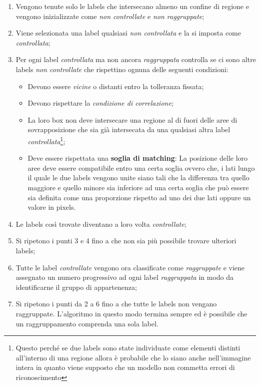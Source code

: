 \begin{enumerate}
\item Vengono tenute solo le labels che intersecano almeno un confine di regione e vengono inizializzate come \textit{non controllate} e \textit{non raggruppate};
\item Viene selezionata una label qualsiasi \textit{non controllata} e la si imposta come \textit{controllata};
\item Per ogni label \textit{controllata} ma non ancora \textit{raggruppata} controlla se ci sono altre labels \textit{non controllate} che rispettino ognuna delle seguenti condizioni:
  \begin{itemize}
  \item Devono essere \textit{vicine} o distanti entro la tolleranza fissata;
  \item Devono rispettare la \textit{condizione di correlazione};
  \item La loro box non deve intersecare una regione al di fuori delle aree di sovrapposizione che sia già intersecata da una qualsiasi altra label \textit{controllata}\footnote{Questo perché se due labels sono state individuate come elementi distinti all'interno di una regione allora è probabile che lo siano anche nell'immagine intera in quanto viene supposto che un modello non commetta errori di riconoscimento};
  \item Deve essere rispettata una \textbf{soglia di matching}: La posizione delle loro aree deve essere compatibile entro una certa soglia ovvero che, i lati lungo il quale le due labels vengono unite siano tali che la differenza tra quello maggiore e quello minore sia inferiore ad una certa soglia che può essere sia definita come una proporzione rispetto ad uno dei due lati oppure un valore in pixels.
  \end{itemize}  
\item Le labels così trovate diventano a loro volta \textit{controllate};
\item Si ripetono i punti 3 e 4 fino a che non sia più possibile trovare ulteriori labels;
\item Tutte le label \textit{controllate} vengono ora classificate come \textit{raggruppate} e viene assegnato un numero progressivo ad ogni label \textit{raggruppata} in modo da identificarne il gruppo di appartenenza;
\item Si ripetono i punti da 2 a 6 fino a che tutte le labels non vengano raggruppate. L'algoritmo in questo modo termina sempre ed è possibile che un raggruppamento comprenda una sola label.
\end{enumerate}
